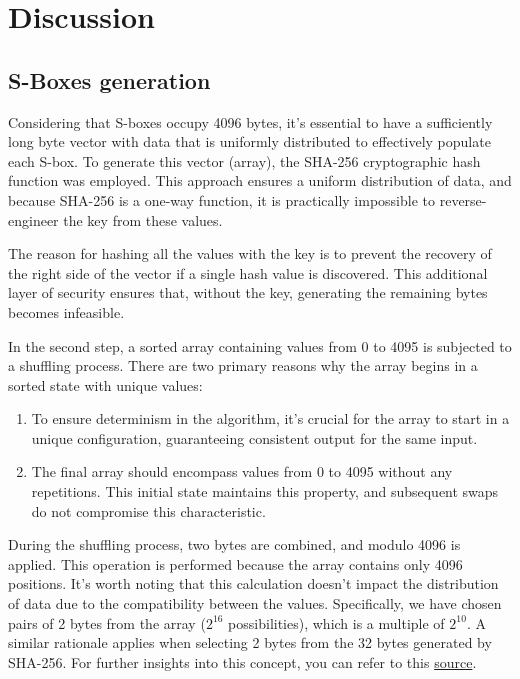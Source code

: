 \documentclass{article} %
\begin{document}
\section {Discussion}

\subsection{S-Boxes generation}
\label{sboxgen}
Considering that S-boxes occupy 4096 bytes, it's essential to have a sufficiently long byte vector with data that is uniformly distributed to effectively populate each S-box. To generate this vector (array), the SHA-256 cryptographic hash function was employed. This approach ensures a uniform distribution of data, and because SHA-256 is a one-way function, it is practically impossible to reverse-engineer the key from these values.

The reason for hashing all the values with the key is to prevent the recovery of the right side of the vector if a single hash value is discovered. This additional layer of security ensures that, without the key, generating the remaining bytes becomes infeasible.

In the second step, a sorted array containing values from 0 to 4095 is subjected to a shuffling process. There are two primary reasons why the array begins in a sorted state with unique values:

\begin{enumerate}
\item To ensure determinism in the algorithm, it's crucial for the array to start in a unique configuration, guaranteeing consistent output for the same input.
\item The final array should encompass values from 0 to 4095 without any repetitions. This initial state maintains this property, and subsequent swaps do not compromise this characteristic.
\end{enumerate}

During the shuffling process, two bytes are combined, and modulo 4096 is applied. This operation is performed because the array contains only 4096 positions. It's worth noting that this calculation doesn't impact the distribution of data due to the compatibility between the values. Specifically, we have chosen pairs of 2 bytes from the array ($2^{16}$ possibilities), which is a multiple of $2^{10}$. A similar rationale applies when selecting 2 bytes from the 32 bytes generated by SHA-256. For further insights into this concept, you can refer to this \href{https://crypto.stackexchange.com/a/21010}{source}.
\end{document}
